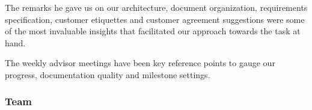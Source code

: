 The remarks he gave us on our architecture, document organization, requirements specification, customer etiquettes and customer agreement suggestions were some of the most invaluable insights that facilitated our approach towards the task at hand.

The weekly advisor meetings have been key reference points to gauge our progress, documentation quality and milestone settings.
	\subsubsection{Team}
	


